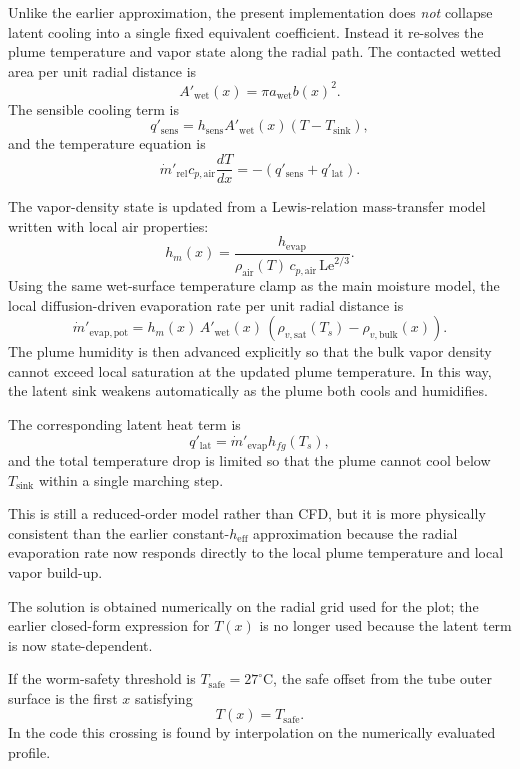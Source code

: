 \documentclass{article}
\begin{document}
Unlike the earlier approximation, the present implementation does
\emph{not} collapse latent cooling into a single fixed equivalent
coefficient. Instead it re-solves the plume temperature and vapor state
along the radial path. The contacted wetted area per unit radial distance is
\begin{equation}
A'_{\mathrm{wet}}(x) = \pi a_{\mathrm{wet}} b(x)^2.
\end{equation}
The sensible cooling term is
\begin{equation}
q'_{\mathrm{sens}}
= h_{\mathrm{sens}} A'_{\mathrm{wet}}(x)\left(T-T_{\mathrm{sink}}\right),
\end{equation}
and the temperature equation is
\begin{equation}
\dot{m}'_{\mathrm{rel}} c_{p,\mathrm{air}} \frac{dT}{dx}
= -\left(q'_{\mathrm{sens}} + q'_{\mathrm{lat}}\right).
\end{equation}

The vapor-density state is updated from a Lewis-relation mass-transfer model
written with local air properties:
\begin{equation}
h_m(x)
=
\frac{h_{\mathrm{evap}}}
{\rho_{\mathrm{air}}(T)\,c_{p,\mathrm{air}}\,\mathrm{Le}^{2/3}}.
\end{equation}
Using the same wet-surface temperature clamp as the main moisture model, the
local diffusion-driven evaporation rate per unit radial distance is
\begin{equation}
\dot{m}'_{\mathrm{evap,pot}}
=
h_m(x)\,A'_{\mathrm{wet}}(x)\,
\left(\rho_{v,\mathrm{sat}}(T_s)-\rho_{v,\mathrm{bulk}}(x)\right).
\end{equation}
The plume humidity is then advanced explicitly so that the bulk vapor density
cannot exceed local saturation at the updated plume temperature. In this
way, the latent sink weakens automatically as the plume both cools and
humidifies.

The corresponding latent heat term is
\begin{equation}
q'_{\mathrm{lat}}
=
\dot{m}'_{\mathrm{evap}} h_{fg}(T_s),
\end{equation}
and the total temperature drop is limited so that the plume cannot cool
below $T_{\mathrm{sink}}$ within a single marching step.

This is still a reduced-order model rather than CFD, but it is more
physically consistent than the earlier constant-$h_{\mathrm{eff}}$
approximation because the radial evaporation rate now responds directly to
the local plume temperature and local vapor build-up.
\par
The solution is obtained numerically on the radial grid used for the plot;
the earlier closed-form expression for $T(x)$ is no longer used because the
latent term is now state-dependent.
\par
If the worm-safety threshold is $T_{\mathrm{safe}} = 27^\circ\mathrm{C}$,
the safe offset from the tube outer surface is the first $x$ satisfying
\begin{equation}
T(x)=T_{\mathrm{safe}}.
\end{equation}
In the code this crossing is found by interpolation on the numerically
evaluated profile.
\end{document}
